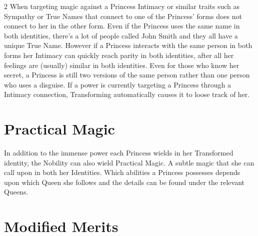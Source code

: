 \begin{multicols}{2}
When targeting magic against a Princess Intimacy or similar traits such as Sympathy or True Names that connect to one of the Princess' forms does not connect to her in the other form. Even if the Princess uses the same name in both identities, there's a lot of people called John Smith and they all have a unique True Name. However if a Princess interacts with the same person in both forms her Intimacy can quickly reach parity in both identities, after all her feelings are (usually) similar in both identities. Even for those who know her secret, a Princess is still two versions of the same person rather than one person who uses a disguise. If a power is currently targeting a Princess through a Intimacy connection, Transforming automatically causes it to loose track of her. 

\section*{Practical Magic}

In addition to the immense power each Princess wields in her Transformed identity, the Nobility can also wield Practical Magic. A subtle magic that she can call upon in both her Identities. Which abilities a Princess possesses depends upon which Queen she follows and the details can be found under the relevant Queens. 

\section*{Modified Merits}
\label{sec:Merits}


\end{multicols}
